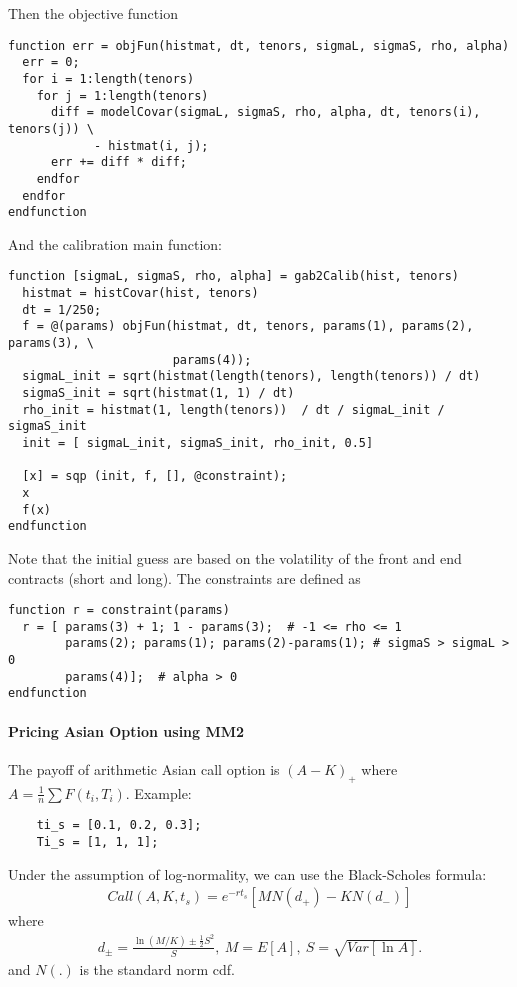 \documentclass[12pt,a4paper,hidelinks,fleqn]{article}            %
\begin{document}
Then the objective function 
\begin{verbatim}
function err = objFun(histmat, dt, tenors, sigmaL, sigmaS, rho, alpha)
  err = 0;
  for i = 1:length(tenors)
    for j = 1:length(tenors)
      diff = modelCovar(sigmaL, sigmaS, rho, alpha, dt, tenors(i), tenors(j)) \
            - histmat(i, j);
      err += diff * diff;
    endfor
  endfor
endfunction
\end{verbatim}
And the calibration main function:
\begin{verbatim}
function [sigmaL, sigmaS, rho, alpha] = gab2Calib(hist, tenors)
  histmat = histCovar(hist, tenors)
  dt = 1/250;
  f = @(params) objFun(histmat, dt, tenors, params(1), params(2), params(3), \
  					   params(4));
  sigmaL_init = sqrt(histmat(length(tenors), length(tenors)) / dt)
  sigmaS_init = sqrt(histmat(1, 1) / dt)
  rho_init = histmat(1, length(tenors))  / dt / sigmaL_init / sigmaS_init
  init = [ sigmaL_init, sigmaS_init, rho_init, 0.5]

  [x] = sqp (init, f, [], @constraint);
  x
  f(x)
endfunction
\end{verbatim}
Note that the initial guess are based on the volatility of the front and end contracts (short and long).
The constraints are defined as
\begin{verbatim}
function r = constraint(params)
  r = [ params(3) + 1; 1 - params(3);  # -1 <= rho <= 1
        params(2); params(1); params(2)-params(1); # sigmaS > sigmaL > 0
        params(4)];  # alpha > 0
endfunction
\end{verbatim}

\paragraph{Pricing Asian Option using MM2}
The payoff of arithmetic Asian call option is $(A - K)_+$ where $A = \frac{1}{n}\sum F(t_i, T_i)$.  
Example:
\begin{verbatim}
	ti_s = [0.1, 0.2, 0.3];
	Ti_s = [1, 1, 1];
\end{verbatim}

Under the assumption of log-normality, we can use the Black-Scholes formula:
\begin{align*}
Call(A, K, t_s) = e^{-rt_s}[M N(d_+) - KN(d_-)]
\end{align*}
where
\begin{align*}
d_{\pm} = \frac{\ln (M/K) \pm \frac{1}{2}S^2}{S}, 
~M = E[A], ~S=\sqrt{Var[\ln A]}.
\end{align*}
and $N(.)$ is the standard norm cdf.
\end{document}
